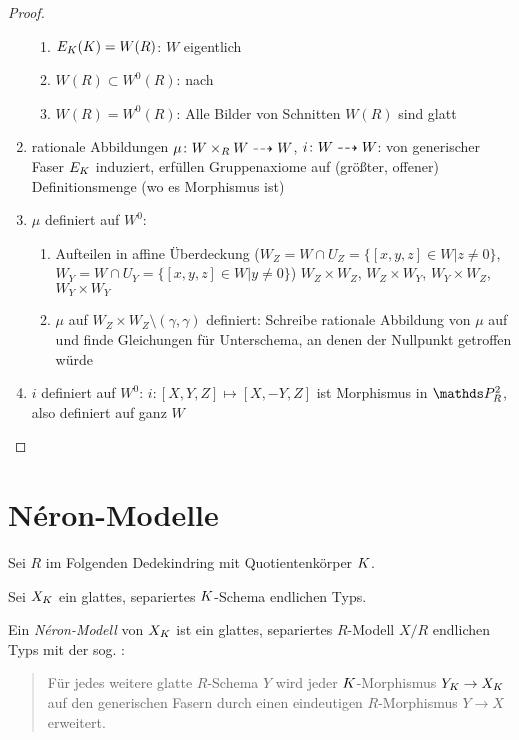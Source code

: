 \documentclass[german]{scrreprt}
\begin{document}
\begin{Lemma}
\begin{proof}
\begin{enumerate}
      \begin{enumerate}
      \item $E_{K}(K)=W(R)$: $W$ eigentlich
      \item $W(R)\subset W^0(R)$:
        nach \cite[Proposition IV.4.3 (b)]{silverman2}
      \item $W(R)=W^0(R)$: Alle Bilder von Schnitten $W(R)$ sind
        glatt
      \end{enumerate}
    \item rationale Abbildungen
      $\mu\colon W\times_R W\dashrightarrow W$,
      $i\colon W\dashrightarrow W$:
      von generischer Faser $E_{K}$ induziert, erfüllen Gruppenaxiome
      auf (größter, offener) Definitionsmenge (wo es Morphismus ist)
    \item $\mu$ definiert auf $W^0$:
      \begin{enumerate}
      \item Aufteilen in affine Überdeckung
        ($W_Z=W\cap U_Z=\{[x,y,z]\in W| z\neq0\}$,
        $W_Y=W\cap U_Y=\{[x,y,z]\in W| y\neq0\}$)
        $W_Z\times W_Z$, $W_Z\times W_Y$, $W_Y\times W_Z$,
        $W_Y\times W_Y$
      \item $\mu$ auf $W_Z\times W_Z\setminus(\gamma,\gamma)$
        definiert:
        Schreibe rationale Abbildung von $\mu$ auf und finde
        Gleichungen für Unterschema, an denen der Nullpunkt getroffen
        würde
      \end{enumerate}
    \item $i$ definiert auf $W^0$:
      $i\colon [X,Y,Z]\mapsto [X,-Y,Z]$ ist Morphismus in $\P_R^2$,
      also definiert auf ganz $W$
    \end{enumerate}
  \end{proof}
\end{Lemma}



\chapter{Néron-Modelle}
Sei $R$ im Folgenden Dedekindring mit Quotientenkörper $K$.

\begin{Definition}
  Sei $X_{K}$ ein glattes, separiertes $K$-Schema endlichen Typs.

  Ein \emph{Néron-Modell} von $X_{K}$ ist ein glattes, separiertes
  $R$-Modell $X/R$ endlichen Typs mit der
  sog. \NAbbEig:
  \begin{quote}
    Für jedes weitere glatte $R$-Schema $Y$ wird jeder
    $K$-Morphismus $Y_{K}\to X_{K}$ auf den generischen Fasern durch
    einen eindeutigen $R$-Morphismus $Y\to X$ erweitert.
  \end{quote}
  \cite[1.2, Definition 1]{neron}
\end{Definition}
\end{document}
